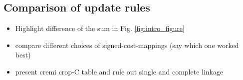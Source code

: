 


\subsection{Comparison of update rules} \label{sec:exp_first_comparison}
\begin{itemize}
  \item Highlight difference of the sum in Fig. \ref{fig:intro_figure}
  \item compare different choices of signed-cost-mappings (say which one worked best)
  \item present cremi crop-C table and rule out single and complete linkage
\end{itemize}




